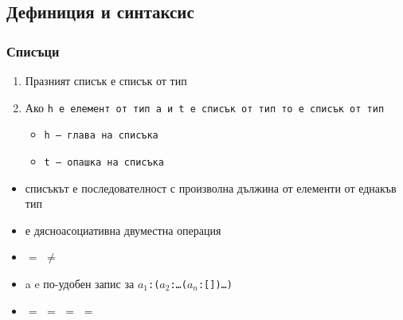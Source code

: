 \documentclass{beamer}
\begin{document}
\subsection{Дефиниция и синтаксис}


\begin{frame}
  \frametitle{Списъци}

  \begin{definition}
    \begin{enumerate}
    \item Празният списък \lst{[]} е списък от тип \lst{[a]}
    \item Ако \tt h е елемент от тип \tt a и \tt t е списък от тип \lst{[a]} то  е списък от тип \lst{[a]}
      \begin{itemize}
      \item \tt h --- глава на списъка
      \item \tt t --- опашка на списъка
      \end{itemize}
    \end{enumerate}
  \end{definition}
  \onslide<+->
  \begin{itemize}[<+->]
  \item списъкът е последователност с \alert{произволна дължина} от елементи от \alert{еднакъв тип}
  \item {}  е \alert{дясноасоциативна} двуместна операция
  \item {} $=$  $\neq$ 
  \item \hlist a e по-удобен запис за $a_1$\tt{:(}$a_2$\tt:\ldots($a_n$\tt{:[])}\ldots\tt)
  \item \lst{[1,2,3,4]} $=$  $=$  $=$  $=$ \
  \end{itemize}
\end{frame}
\end{document}
